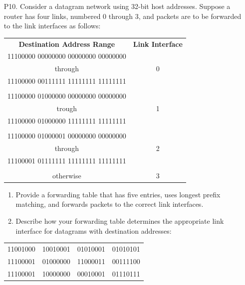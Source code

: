 \begin{enumerate}
    \item[P10.] Consider a datagram network using 32-bit host addresses. Suppose a router has four links, numbered 0 through 3, and packets are to be forwarded to the link interfaces as follows:
    \begin{table}[H]
        \centering
        \begin{tabular}{cc}
            \textbf{Destination Address Range} & \textbf{Link Interface} \\
            11100000 00000000 00000000 00000000 & \\
            through & 0 \\
            11100000 00111111 11111111 11111111 & \\
             & \\
            11100000 01000000 00000000 00000000 & \\
            trough & 1 \\
            11100000 01000000 11111111 11111111 & \\
             & \\
            11100000 01000001 00000000 00000000 & \\
            through & 2 \\
            11100001 01111111 11111111 11111111 & \\
             & \\
            otherwise & 3 \\
        \end{tabular}
        \label{tab:p10}
    \end{table}
    \begin{enumerate}
        \item Provide a forwarding table that has five entries, uses longest prefix matching, and forwards packets to the correct link interfaces.
        \item Describe how your forwarding table determines the appropriate link interface for datagrams with destination addresses:
    \end{enumerate}

    \begin{table}[H]
        \centering
        \begin{tabular}{cccc}
            11001000 & 10010001 & 01010001 & 01010101 \\
            11100001 & 01000000 & 11000011 & 00111100 \\
            11100001 & 10000000 & 00010001 & 01110111 \\
        \end{tabular}
        \label{tab:p10_b2}
    \end{table}


\end{enumerate}
